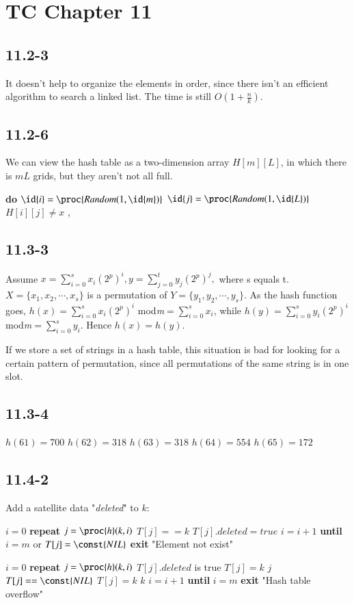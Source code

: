 \documentclass{article}
\begin{document}
\section*{TC Chapter 11}
\subsection*{11.2-3}
It doesn't help to organize the elements in order, since there isn't an efficient algorithm to search a linked list. The time is still $O(1+\frac{n}{k}).$
\subsection*{11.2-6}
We can view the hash table as a two-dimension array $H[m][L]$, in which there is $mL$ grids, but they aren't not all full.
\begin{codebox}
	\zi{}\li 
	\textbf{do}\Do\li 
	$\id{i}=\proc{Random(1,\id{m})}$\li 
	$\id{j}=\proc{Random(1,\id{L})}$\End\li 
	\While $H[i][j]\neq x$\li 
	\Return {}, 
\end{codebox}
\subsection*{11.3-3}
Assume $x=\sum_{i=0}^{s}x_i(2^p)^i, y=\sum_{j=0}^{t}y_j(2^p)^j,$ where s equals t. $X=\{x_1, x_2,\cdots, x_s\}$ is a permutation of $Y=\{y_1, y_2,\cdots, y_s\}$. As the hash function goes, $h(x)=\sum_{i=0}^{s}x_i(2^p)^i$ mod\emph{m}$=\sum_{i=0}^{s}x_i$, while $h(y)=\sum_{i=0}^{s}y_i(2^p)^i$ mod\emph{m}$=\sum_{i=0}^{s}y_i$. Hence $h(x)=h(y)$.\par 
If we store a set of strings in a hash table, this situation is bad for looking for a certain pattern of permutation, since all permutations of the same string is in one slot.
\subsection*{11.3-4}
$h(61)=700$  $h(62)=318$  $h(63)=318$  $h(64)=554$  $h(65)=172$
\subsection*{11.4-2}
Add a satellite data "\emph{deleted}" to $k$:
\begin{codebox}
\zi{}\li 
$i=0$\li 
\textbf{repeat}\Do\li 
    $j=\proc{h}(k,i)$\li 
    \If $T[j]==k$\Then\li 
        $T[j].deleted=true$\li 
        \Return\li 
    \Else\li 
        $i=i+1$\End\End \li 
\textbf{until} $i=m$ or $T[j]=\const{NIL}$\li 
\textbf{exit} "Element not exist"
\end{codebox}
\begin{codebox}\zi 
	\li 
	$i=0$\li 
	\textbf{repeat}\Do\li 
	$j=\proc{h}(k,i)$\li 
	\If $T[j].deleted$ is true\Then\li  
	$T[j]=k$\li 
	\Return $j$\End\li 
	\If $T[j]==\const{NIL}$\Then\li 
	$T[j]=k$\li 
	\Return $k$\li 
	$i=i+1$\End\End\li 
\textbf{until} $i=m$\li 
\textbf{exit} "Hash table overflow"
\end{codebox}
\end{document}
